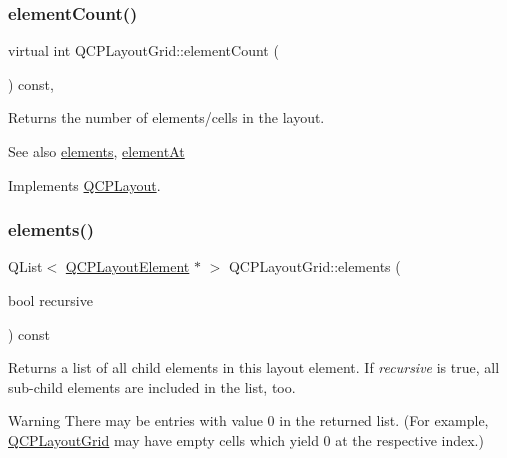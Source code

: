 \subsubsection{\texorpdfstring{element\+Count()}{elementCount()}}
{\footnotesize\ttfamily virtual int Q\+C\+P\+Layout\+Grid\+::element\+Count (\begin{DoxyParamCaption}{ }\end{DoxyParamCaption}) const\hspace{0.3cm}{\ttfamily [inline]}, {\ttfamily [virtual]}}

Returns the number of elements/cells in the layout.

\begin{DoxySeeAlso}{See also}
\hyperlink{class_q_c_p_layout_grid_a7d5b968b4cf57393e9e387976d91f8f7}{elements}, \hyperlink{class_q_c_p_layout_grid_a4288f174082555f6bd92021bdedb75dc}{element\+At} 
\end{DoxySeeAlso}


Implements \hyperlink{class_q_c_p_layout_a39d3e9ef5d9b82ab1885ba1cb9597e56}{Q\+C\+P\+Layout}.

\mbox{\label{class_q_c_p_layout_grid_a7d5b968b4cf57393e9e387976d91f8f7}} 
\subsubsection{\texorpdfstring{elements()}{elements()}}
{\footnotesize\ttfamily Q\+List$<$ \hyperlink{class_q_c_p_layout_element}{Q\+C\+P\+Layout\+Element} $\ast$ $>$ Q\+C\+P\+Layout\+Grid\+::elements (\begin{DoxyParamCaption}\item[{bool}]{recursive }\end{DoxyParamCaption}) const\hspace{0.3cm}{\ttfamily [virtual]}}

Returns a list of all child elements in this layout element. If {\itshape recursive} is true, all sub-\/child elements are included in the list, too.

\begin{DoxyWarning}{Warning}
There may be entries with value 0 in the returned list. (For example, \hyperlink{class_q_c_p_layout_grid}{Q\+C\+P\+Layout\+Grid} may have empty cells which yield 0 at the respective index.) 
\end{DoxyWarning}


